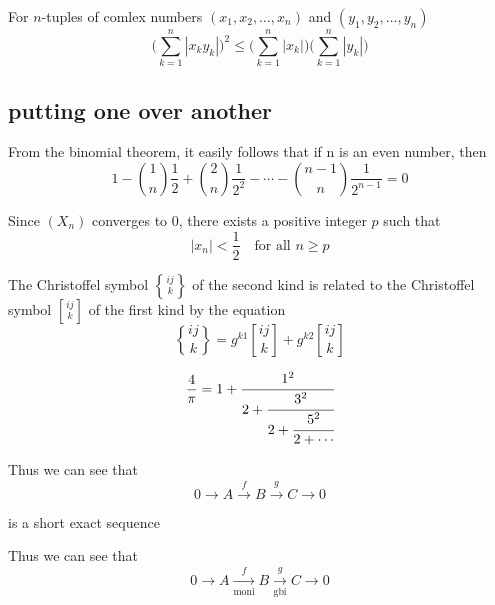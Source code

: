 \documentclass[a4paper, UTF8]{article}
\begin{document}
For $n$-tuples of comlex numbers $(x_1,x_2,\dotsc,x_n)$ and $(y_1,y_2,\dotsc,y_n)$
\begin{equation*}
    \biggl(
    \sum_{k=1}^{n}|x_{k}y_{k}|
    \biggr)^2
    \le
    \biggl(
    \sum_{k=1}^{n}|x_{k}|    
    \biggr)
    \biggl(
    \sum_{k=1}^{n}|y_{k}|    
    \biggr)
\end{equation*}

\subsection{putting one over another}
From the binomial theorem, it easily follows that if n is an even number, then
\begin{equation*}
    1-\binom{1}{n}\frac{1}{2}+\binom{2}{n}\frac{1}{2^2}-\dotsb-\binom{n-1}{n}\frac{1}{2^{n-1}}=0
\end{equation*}

Since $(X_{n})$ converges to $0$, there exists a positive integer $p$ such that
\begin{equation*}
    |x_{n}|<\frac{1}{2}\quad\text{for all $n\ge p$}
\end{equation*}


\newcommand{\rjpda}[2]{\genfrac{\{}{\}}{0pt}{}{#1}{#2}}
\newcommand{\rjpfang}[2]{\genfrac{[}{]}{0pt}{}{#1}{#2}}
The Christoffel symbol $\genfrac{\{}{\}}{0pt}{}{ij}{k}$ of the second kind is related to the Christoffel symbol $\genfrac{[}{]}{0pt}{}{ij}{k}$ of the first kind by the equation
\begin{equation*}
    \rjpda{ij}{k}=g^{k1}\rjpfang{ij}{k}+g^{k2}\rjpfang{ij}{k}
\end{equation*}

\begin{equation*}
    \frac{4}{\pi}= 1+\cfrac{1^2}
                    {2+\cfrac{3^2}
                    {2+\cfrac{5^2}{2+\dotsb}}}
\end{equation*}

Thus we can see that
\begin{equation*}
    0\xrightarrow{} A\xrightarrow{f} B\xrightarrow{g} C\xrightarrow{} 0
\end{equation*}

is a short exact sequence
\newpage

Thus we can see that
\begin{equation*}
    0\xrightarrow{} A\xrightarrow[\text{moni}]{f} B\xrightarrow[\text{gbi}]{g} C\xrightarrow{} 0
\end{equation*}
\end{document}
